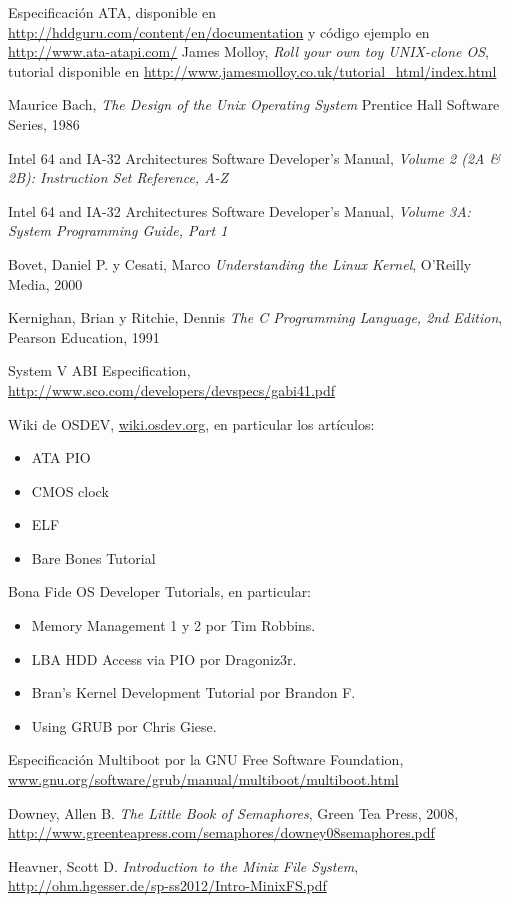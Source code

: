 \begin{thebibliography}{9}

	Especificaci\'on ATA, disponible en \url{http://hddguru.com/content/en/documentation} y
	c\'odigo ejemplo en \url{http://www.ata-atapi.com/}
	James Molloy,
	\textit{Roll your own toy UNIX-clone OS},
	tutorial disponible en \url{http://www.jamesmolloy.co.uk/tutorial_html/index.html}

	Maurice Bach,
	\textit{The Design of the Unix Operating System}
	Prentice Hall Software Series, 
	1986	

	Intel 64 and IA-32 Architectures
	Software Developer’s Manual,
	\textit{Volume 2 (2A \& 2B): Instruction Set Reference, A-Z}

	Intel 64 and IA-32 Architectures
	Software Developer’s Manual,
	\textit{Volume 3A: System Programming Guide, Part 1}

	Bovet, Daniel P. y Cesati, Marco
	\textit{Understanding the Linux Kernel},
	O'Reilly Media, 2000
	
	Kernighan, Brian y Ritchie, Dennis
	\textit{The C Programming Language, 2nd Edition},
	Pearson Education, 1991 

	System V ABI Especification, \url{http://www.sco.com/developers/devspecs/gabi41.pdf}

	Wiki de OSDEV, \url{wiki.osdev.org}, en particular los art\'iculos:
	\begin{itemize}
		\item ATA PIO
		\item CMOS clock
		\item ELF
		\item Bare Bones Tutorial
	\end{itemize}

	Bona Fide OS Developer Tutorials, en particular:
	\begin{itemize}
		\item Memory Management 1 y 2 por Tim Robbins.
		\item LBA HDD Access via PIO por Dragoniz3r.
		\item Bran's Kernel Development Tutorial por Brandon F.
		\item Using GRUB por Chris Giese.
	\end{itemize}

	Especificaci\'on Multiboot por la GNU Free Software Foundation,
	\url{www.gnu.org/software/grub/manual/multiboot/multiboot.html}

	Downey, Allen B.
	\textit{The Little Book of Semaphores},
	Green Tea Press, 2008,
	\url{http://www.greenteapress.com/semaphores/downey08semaphores.pdf}

	Heavner, Scott D.
	\textit{Introduction to the Minix File System},
	\url{http://ohm.hgesser.de/sp-ss2012/Intro-MinixFS.pdf}

\end{thebibliography}
